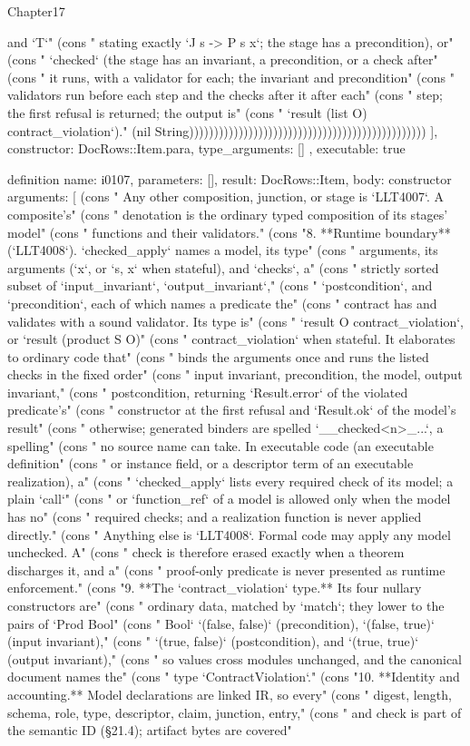 \begin{lexlean}{Chapter17}
\begin{semanticmodule}
{{and `T`" (cons "     stating exactly `J s -> P s x`; the stage has a precondition), or" (cons "     `checked` (the stage has an invariant, a precondition, or a check after" (cons "     it runs, with a validator for each; the invariant and precondition" (cons "     validators run before each step and the checks after it after each" (cons "     step; the first refusal is returned; the output is" (cons "     `result (list O) contract_violation`)." (nil String))))))))))))))))))))))))))))))))))))))))))))))))
    ],
    constructor: DocRows::Item.para,
    type_arguments: []
  },
  executable: true
}

definition{
  name: i0107,
  parameters: [],
  result: DocRows::Item,
  body: constructor{
    arguments: [
      (cons "   Any other composition, junction, or stage is `LLT4007`. A composite's" (cons "   denotation is the ordinary typed composition of its stages' model" (cons "   functions and their validators." (cons "8. **Runtime boundary** (`LLT4008`). `checked_apply` names a model, its type" (cons "   arguments, its arguments (`x`, or `s, x` when stateful), and `checks`, a" (cons "   strictly sorted subset of `input_invariant`, `output_invariant`," (cons "   `postcondition`, and `precondition`, each of which names a predicate the" (cons "   contract has and validates with a sound validator. Its type is" (cons "   `result O contract_violation`, or `result (product S O)" (cons "   contract_violation` when stateful. It elaborates to ordinary code that" (cons "   binds the arguments once and runs the listed checks in the fixed order" (cons "   input invariant, precondition, the model, output invariant," (cons "   postcondition, returning `Result.error` of the violated predicate's" (cons "   constructor at the first refusal and `Result.ok` of the model's result" (cons "   otherwise; generated binders are spelled `__checked<n>_...`, a spelling" (cons "   no source name can take. In executable code (an executable definition" (cons "   or instance field, or a descriptor term of an executable realization), a" (cons "   `checked_apply` lists every required check of its model; a plain `call`" (cons "   or `function_ref` of a model is allowed only when the model has no" (cons "   required checks; and a realization function is never applied directly." (cons "   Anything else is `LLT4008`. Formal code may apply any model unchecked. A" (cons "   check is therefore erased exactly when a theorem discharges it, and a" (cons "   proof-only predicate is never presented as runtime enforcement." (cons "9. **The `contract_violation` type.** Its four nullary constructors are" (cons "   ordinary data, matched by `match`; they lower to the pairs of `Prod Bool" (cons "   Bool` `(false, false)` (precondition), `(false, true)` (input invariant)," (cons "   `(true, false)` (postcondition), and `(true, true)` (output invariant)," (cons "   so values cross modules unchanged, and the canonical document names the" (cons "   type `ContractViolation`." (cons "10. **Identity and accounting.** Model declarations are linked IR, so every" (cons "    digest, length, schema, role, type, descriptor, claim, junction, entry," (cons "    and check is part of the semantic ID (§21.4); artifact bytes are covered" }}
\end{semanticmodule}
\end{lexlean}
